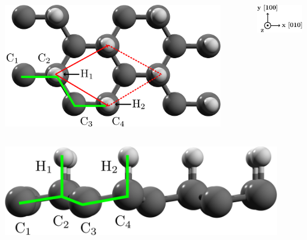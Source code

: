 \documentclass{beamer}
\begin{document}
\begin{frame}

\vspace{-3mm}
\begin{columns}

\flushright
\includegraphics[width=0.9\textwidth]{figs/up1.pdf}

\vspace{5mm}

\flushleft
\includegraphics[width=0.9\textwidth]{figs/arrows1.pdf}

\end{columns}

\vspace{-5mm}

\begin{columns}

\flushright
\includegraphics[width=0.9\textwidth]{figs/up2.pdf}


\end{columns}
\end{frame}
\end{document}
